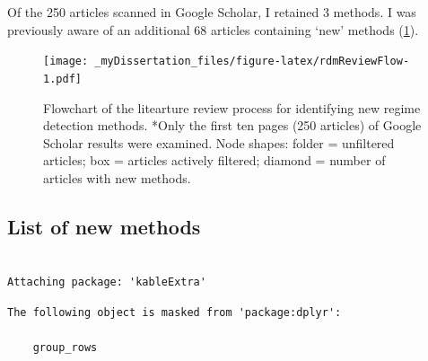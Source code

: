 \documentclass[12pt,twoside,openany]{reedthesis}
\begin{document}
Of the 250 articles scanned in Google Scholar, I retained 3 methods. I
was previously aware of an additional 68 articles containing `new'
methods (\ref{fig:rdmReviewFlow}).
\begin{figure}
\centering
\texttt{[image: \_myDissertation\_files/figure-latex/rdmReviewFlow-1.pdf]}
\caption{\label{fig:rdmReviewFlow}Flowchart of the litearture review process
for identifying new regime detection methods. *Only the first ten pages
(250 articles) of Google Scholar results were examined. Node shapes:
folder = unfiltered articles; box = articles actively filtered; diamond
= number of articles with new methods.}
\end{figure}
\subsection{List of new methods}\label{list-of-new-methods}
\begin{verbatim}

Attaching package: 'kableExtra'
\end{verbatim}
\begin{verbatim}
The following object is masked from 'package:dplyr':

    group_rows
\end{verbatim}
\end{document}
